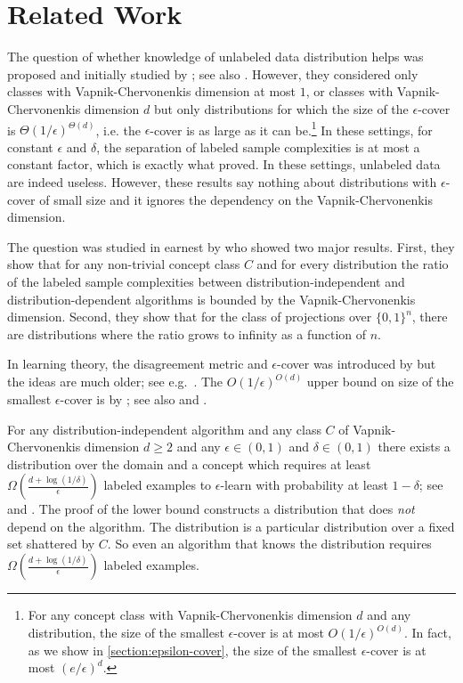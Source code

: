 \section{Related Work}
\label{section:related-work}

The question of whether knowledge of unlabeled data distribution helps was
proposed and initially studied by \citet{Ben-David-Lu-Pal-2008}; see also
\citet{Lu-2009}. However, they considered only classes with Vapnik-Chervonenkis
dimension at most $1$, or classes with Vapnik-Chervonenkis dimension $d$ but
only distributions for which the size of the $\epsilon$-cover is
$\Theta(1/\epsilon)^{\Theta(d)}$, i.e. the $\epsilon$-cover is as large as it
can be.\footnote{For any concept class with Vapnik-Chervonenkis dimension $d$
and any distribution, the size of the smallest $\epsilon$-cover is at most
$O(1/\epsilon)^{O(d)}$. In fact, as we show in \autoref{section:epsilon-cover},
the size of the smallest $\epsilon$-cover is at most $(e/\epsilon)^d$.} In these
settings, for constant $\epsilon$ and $\delta$, the separation of labeled sample
complexities is at most a constant factor, which is exactly what
\citet{Ben-David-Lu-Pal-2008} proved. In these settings, unlabeled data are
indeed useless. However, these results say nothing about distributions with
$\epsilon$-cover of small size and it ignores the dependency on the
Vapnik-Chervonenkis dimension.

The question was studied in earnest by \citet{Darnstadt-Simon-Szorenyi-2013} who
showed two major results. First, they show that for any non-trivial concept
class $C$ and for every distribution the ratio of the labeled sample
complexities between distribution-independent and distribution-dependent
algorithms is bounded by the Vapnik-Chervonenkis dimension. Second, they show
that for the class of projections over $\{0,1\}^n$, there are distributions
where the ratio grows to infinity as a function of $n$.

In learning theory, the disagreement metric and $\epsilon$-cover was  introduced
by \citet{Benedek-Itai-1991} but the ideas are much older; see
e.g.~\citet{Dudley-1978, Dudley-1984}. The $O(1/\epsilon)^{O(d)}$ upper bound on
size of the smallest $\epsilon$-cover is by \citet[Lemma 7.13]{Dudley-1978}; see
also \citet[Chapter 4]{Devroye-Lugosi-2000} and \citet{Haussler-1995}.

For any distribution-independent algorithm and any class $C$ of
Vapnik-Chervonenkis dimension $d \ge 2$ and any $\epsilon \in (0,1)$ and $\delta
\in (0,1)$ there exists a distribution over the domain and a concept which
requires at least $\Omega \left(\frac{d + \log(1/\delta)}{\epsilon}\right)$
labeled examples to $\epsilon$-learn with probability at least $1 - \delta$;
see~\citet[Theorem 5.3]{Anthony-Bartlett-1999} and
\citet{Blumer-Ehrenfeucht-Haussler-Warmuth-1989,
Ehrenfeucht-Haussler-Kearns-Valiant-1989}. The proof of the lower bound
constructs a distribution that does \emph{not} depend on the algorithm. The
distribution is a particular distribution over a fixed set shattered by $C$. So
even an algorithm that knows the distribution requires $\Omega \left(\frac{d +
\log(1/\delta)}{\epsilon}\right)$ labeled examples.
